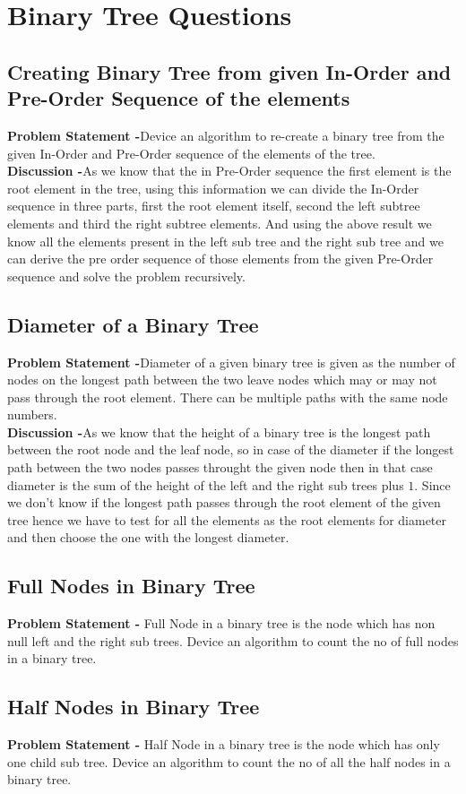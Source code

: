 \documentclass[12pt,a4paper,draft]{article}
\begin{document}
\section{Binary Tree Questions}
\subsection{Creating Binary Tree from given In-Order and Pre-Order Sequence of the elements}
\textbf{Problem Statement -}Device an algorithm to re-create a binary tree from the given In-Order and Pre-Order sequence of the elements of the tree.
\\
\textbf{Discussion -}As we know that the in Pre-Order sequence the first element is the root element in the tree, using this information we can divide the In-Order sequence in three parts, first the root element itself, second the left subtree elements and third the right subtree elements. And using the above result we know all the elements present in the left sub tree and the right sub tree and we can derive the pre order sequence of those elements from the given Pre-Order sequence and solve the problem recursively.
\subsection{Diameter of a Binary Tree}
\textbf{Problem Statement -}Diameter of a given binary tree is given as the number of nodes on the longest path between the two leave nodes which may or may not pass through the root element. There can be multiple paths with the same node numbers.
\\
\textbf{Discussion -}As we know that the height of a binary tree is the longest path between the root node and the leaf node, so in case of the diameter if the longest path between the two nodes passes throught the given node then in that case diameter is the sum of the height of the left and the right sub trees plus $1$. Since we don't know if the longest path passes through the root element of the given tree hence we have to test for all the elements as the root elements for diameter and then choose the one with the longest diameter.
\subsection{Full Nodes in Binary Tree}
\textbf{Problem Statement -} Full Node in a binary tree is the node which has non null left and the right sub trees. Device an algorithm to count the no of full nodes in a binary tree.
\subsection{Half Nodes in Binary Tree}
\textbf{Problem Statement -} Half Node in a binary tree is the node which has only one child sub tree. Device an algorithm to count the no of all the half nodes in a binary tree.
\end{document}
